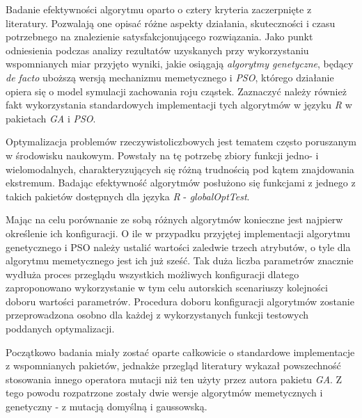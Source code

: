 \par
Badanie efektywności algorytmu oparto o cztery kryteria zaczerpnięte z literatury. Pozwalają one opisać różne aspekty działania, skuteczności i czasu potrzebnego na znalezienie satysfakcjonującego rozwiązania. Jako punkt odniesienia podczas analizy rezultatów uzyskanych przy wykorzystaniu wspomnianych miar przyjęto wyniki, jakie osiągają \emph{algorytmy genetyczne}, będący \emph{de facto} uboższą wersją mechanizmu memetycznego i \emph{PSO}, którego działanie opiera się o model symulacji zachowania roju cząstek. Zaznaczyć należy również fakt wykorzystania standardowych implementacji tych algorytmów w języku \emph{R} w pakietach \emph{GA} i \emph{PSO}.
\par
Optymalizacja problemów rzeczywistoliczbowych jest tematem często poruszanym w środowisku naukowym. Powstały na tę potrzebę zbiory funkcji jedno- i wielomodalnych, charakteryzujących się różną trudnością pod kątem znajdowania ekstremum. Badając efektywność algorytmów posłużono się funkcjami z jednego z takich pakietów dostępnych dla języka \emph{R} - \emph{globalOptTest}.
\par
Mając na celu porównanie ze sobą różnych algorytmów konieczne jest najpierw określenie ich konfiguracji. O ile w przypadku przyjętej implementacji algorytmu genetycznego i PSO należy ustalić wartości zaledwie trzech atrybutów, o tyle dla algorytmu memetycznego jest ich już sześć. Tak duża liczba parametrów znacznie wydłuża proces przeglądu wszystkich możliwych konfiguracji dlatego zaproponowano wykorzystanie w tym celu autorskich scenariuszy kolejności doboru wartości parametrów. Procedura doboru konfiguracji algorytmów zostanie przeprowadzona osobno dla każdej z wykorzystanych funkcji testowych poddanych optymalizacji. 
\par
Początkowo badania miały zostać oparte całkowicie o standardowe implementacje z wspomnianych pakietów, jednakże przegląd literatury wykazał powszechność stosowania innego operatora mutacji niż ten użyty przez autora pakietu \emph{GA}. Z tego powodu rozpatrzone zostały dwie wersje algorytmów memetycznych i genetyczny - z mutacją domyślną i gaussowską. 


